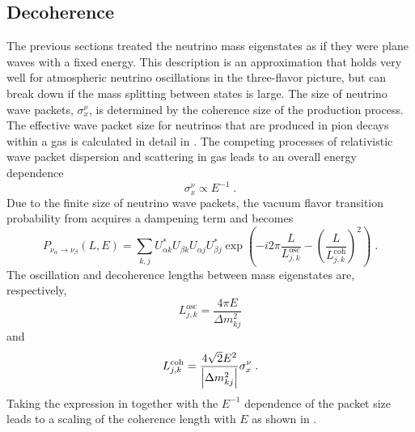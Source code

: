 \subsection{Decoherence}
\label{sec:decoherence}
The previous sections treated the neutrino mass eigenstates as if they were plane waves with a fixed energy.
This description is an approximation that holds very well for atmospheric neutrino oscillations in the three-flavor picture, but can break down if the mass splitting between states is large.
The size of neutrino wave packets, $\sigma_x^\nu$, is determined by the coherence size of the production process.
The effective wave packet size for neutrinos that are produced in pion decays within a gas is calculated in detail in .
The competing processes of relativistic wave packet dispersion and scattering in gas leads to an overall energy dependence
\begin{equation}
    \sigma_x^\nu \propto E^{-1}\;.
\end{equation}
Due to the finite size of neutrino wave packets, the vacuum flavor transition probability from  acquires a dampening term and becomes
\begin{equation}
    P_{\nu_\alpha \rightarrow \nu_\beta}(L,E) = \sum_{k,j}U^*_{\alpha k}U_{\beta k}U_{\alpha j}U_{\beta j}^* \exp(-i2\pi\frac{L}{L^\mathrm{osc}_{j,k}} - \left(\frac{L}{L^\mathrm{coh}_{j,k}}\right)^2)\;.
\end{equation}
The oscillation and decoherence lengths between mass eigenstates are, respectively,
\begin{equation}
    L^\mathrm{osc}_{j,k} = \frac{4\pi E}{\Delta m^2_{kj}}
\end{equation}
and
\begin{equation}
    L^\mathrm{coh}_{j,k} = \frac{4\sqrt{2}E^2}{\abs{\Delta m^2_{kj}}} \sigma_x^\nu\;.\label{eq:coh-length}
\end{equation}
Taking the expression in  together with the $E^{-1}$ dependence of the packet size leads to a scaling of the coherence length with $E$ as shown in .

